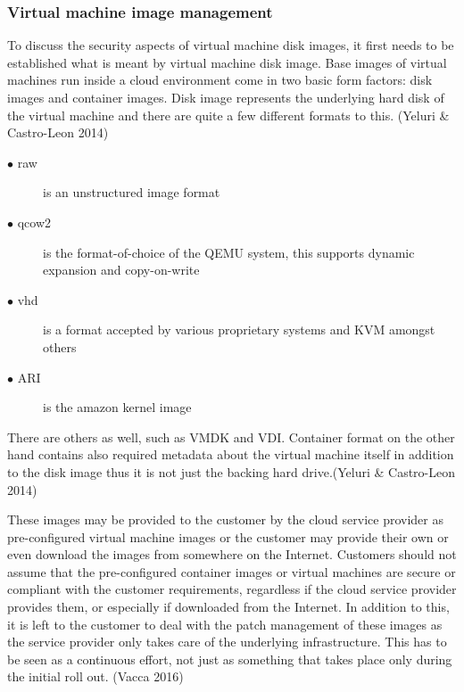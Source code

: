 \documentclass{article}
\begin{document}
\subsubsection{Virtual machine image management}
To discuss the security aspects of virtual machine disk images, it first needs to be established what is meant by virtual machine disk image.
Base images of virtual machines run inside a cloud environment come in two basic form factors: disk images and container images. Disk image represents the underlying hard disk of the virtual machine and there are quite a few different formats to this. (Yeluri \& Castro-Leon 2014)
\begin{description}
	\item[$\bullet$ raw] is an unstructured image format
	\item[$\bullet$ qcow2] is the format-of-choice of the QEMU system, this supports dynamic expansion and copy-on-write
	\item[$\bullet$ vhd] is a format accepted by various proprietary systems and KVM amongst others
	\item[$\bullet$ ARI] is the amazon kernel image
\end{description}
There are others as well, such as VMDK and VDI. Container format on the other hand contains also required metadata about the virtual machine itself in addition to the disk image thus it is not just the backing hard drive.(Yeluri \& Castro-Leon 2014)
\par
These images may be provided to the customer by the cloud service provider as pre-configured virtual machine images or the customer may provide their own or even download the images from somewhere on the Internet. Customers should not assume that the pre-configured container images or virtual machines are secure or compliant with the customer requirements, regardless if the cloud service provider provides them,  or especially if downloaded from the Internet. In addition to this, it is left to the customer to deal with the patch management of these images as the service provider only takes care of the underlying infrastructure. This has to be seen as a continuous effort, not just as something that takes place only during the initial roll out. (Vacca 2016)
\end{document}
